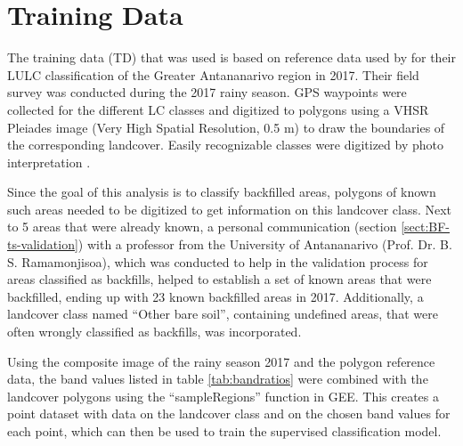 \documentclass[11pt, A4, oneside]{report}
\begin{document}
\section{Training Data}\label{TD}
The training data (TD) that was used is based on reference data used by \citet{Dupuy.2020a} for their LULC classification of the Greater Antananarivo region in 2017. Their field survey was conducted during the 2017 rainy season. GPS waypoints were collected for the different LC classes and digitized to polygons using a VHSR Pleiades image (Very High Spatial Resolution, 0.5 m) to draw the boundaries of the corresponding landcover. Easily recognizable classes were digitized by photo interpretation \parencite{Dupuy.2020a}.

Since the goal of this analysis is to classify backfilled areas, polygons of known such areas needed to be digitized to get information on this landcover class. Next to 5 areas that were already known, a personal communication (section \ref{sect:BF-ts-validation}) with a professor from the University of Antananarivo (Prof. Dr. B. S. Ramamonjisoa), which was conducted to help in the validation process for areas classified as backfills, helped to establish a set of known areas that were backfilled, ending up with 23 known backfilled areas in 2017. Additionally, a landcover class named “Other bare soil”, containing undefined areas, that were often wrongly classified as backfills, was incorporated.

Using the composite image of the rainy season 2017 and the polygon reference data, the band values listed in table \ref{tab:bandratios} were combined with the landcover polygons using the “sampleRegions” function in GEE. This creates a point dataset with data on the landcover class and on the chosen band values for each point, which can then be used to train the supervised classification model.
\end{document}
